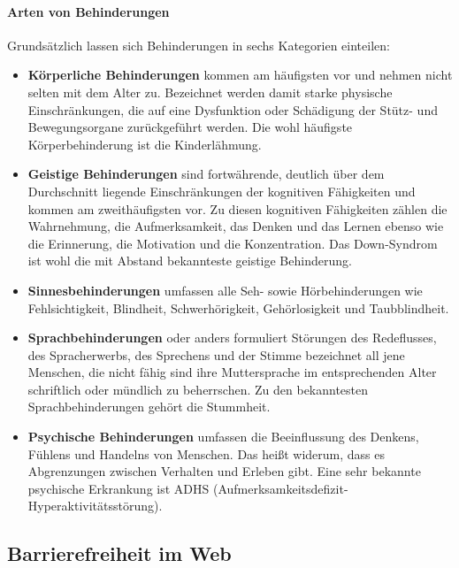 \paragraph{Arten von Behinderungen}
Grundsätzlich lassen sich Behinderungen in sechs Kategorien einteilen:

\begin{itemize}
    \item \textbf{Körperliche Behinderungen} kommen am häufigsten vor und nehmen nicht selten mit dem Alter zu. Bezeichnet werden damit starke physische 
    Einschränkungen, die auf eine Dysfunktion oder Schädigung der Stütz- und Bewegungsorgane zurückgeführt werden. Die wohl häufigste Körperbehinderung ist
    die Kinderlähmung.
    \item \textbf{Geistige Behinderungen} sind fortwährende, deutlich über dem Durchschnitt liegende Einschränkungen der kognitiven Fähigkeiten und kommen am
    zweithäufigsten vor. Zu diesen kognitiven Fähigkeiten zählen die Wahrnehmung, die Aufmerksamkeit, das Denken und das Lernen ebenso wie die Erinnerung, 
    die Motivation und die Konzentration. Das Down-Syndrom ist wohl die mit Abstand bekannteste geistige Behinderung.
    \item \textbf{Sinnesbehinderungen} umfassen alle Seh- sowie Hörbehinderungen wie Fehlsichtigkeit, Blindheit, Schwerhörigkeit, 
    Gehörlosigkeit und Taubblindheit.
    \item \textbf{Sprachbehinderungen} oder anders formuliert Störungen des Redeflusses, des Spracherwerbs, des Sprechens und der Stimme bezeichnet all jene 
    Menschen, die nicht fähig sind ihre Muttersprache im entsprechenden Alter schriftlich oder mündlich zu beherrschen. Zu den bekanntesten Sprachbehinderungen 
    gehört die Stummheit.
    \item \textbf{Psychische Behinderungen} umfassen die Beeinflussung des Denkens, Fühlens und Handelns von Menschen. Das heißt widerum, dass es Abgrenzungen
    zwischen Verhalten und Erleben gibt. Eine sehr bekannte psychische Erkrankung ist ADHS (Aufmerksamkeitsdefizit-Hyperaktivitätsstörung).
\end{itemize}

\subsection{Barrierefreiheit im Web}
